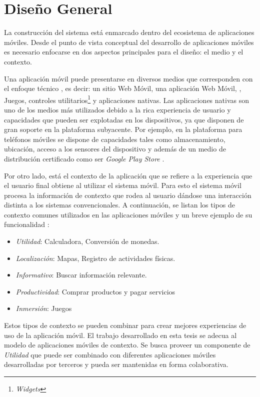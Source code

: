 \section{Diseño General}

\label{sec52:dise=0000F1o}La construcción del sistema \emph{
}está enmarcado dentro del ecosistema de aplicaciones móviles. Desde
el punto de vista conceptual del desarrollo de aplicaciones móviles
es necesario enfocarse en dos aspectos principales para el diseño:
el medio y el contexto.

Una aplicación móvil puede presentarse en diversos medios que corresponden
con el enfoque técnico \cite{Fling2009}, es decir: un sitio Web Móvil,
una aplicación Web Móvil, , Juegos, controles utilitarios\footnote{\emph{Widgets}}
y aplicaciones nativas. Las aplicaciones nativas son uno de los medios
más utilizados debido a la rica experiencia de usuario y capacidades
que pueden ser explotadas en los dispositivos, ya que disponen de
gran soporte en la plataforma subyacente. Por ejemplo, en la plataforma
para teléfonos móviles \emph{ }se dispone de capacidades
tales como almacenamiento, ubicación, acceso a los sensores del dispositivo
y además de un medio de distribución certificado como ser \emph{Google
Play Store} \cite{Google2016p}. 

Por otro lado, está el contexto de la aplicación que se refiere a
la experiencia que el usuario final obtiene al utilizar el sistema
móvil. Para esto el sistema móvil procesa la información de contexto
que rodea al usuario dándose una interacción distinta a los sistemas
convencionales. A continuación, se listan los tipos de contexto comunes
utilizados en las aplicaciones móviles y un breve ejemplo de su funcionalidad
\cite{Fling2009}:
\begin{itemize}
\item \emph{Utilidad}: Calculadora, Conversión de monedas.
\item \emph{Localización}: Mapas, Registro de actividades físicas.
\item \emph{Informativo}: Buscar información relevante.
\item \emph{Productividad}: Comprar productos y pagar servicios
\item \emph{Inmersión}: Juegos 
\end{itemize}
Estos tipos de contexto se pueden combinar para crear mejores experiencias
de uso de la aplicación móvil. El trabajo desarrollado en esta tesis
se adecua al modelo de aplicaciones móviles de contexto. Se busca
proveer un componente de \emph{Utilidad} que puede ser combinado con
diferentes aplicaciones móviles desarrolladas por terceros y pueda
ser mantenidas en forma colaborativa. 

